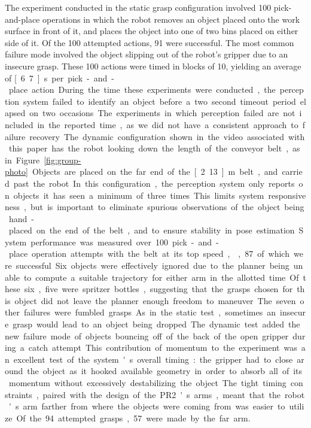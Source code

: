 \documentclass[letterpaper, 10 pt, conference]{ieeeconf}  %
\begin{document}
The experiment conducted in the static grasp configuration involved
100 pick-and-place operations in which the robot removes an object
placed onto the work surface in front of it, and places the object
into one of two bins placed on either side of it. Of the 100 attempted
actions, 91 were successful. The most common failure mode involved the
object slipping out of the robot's gripper due to an insecure
grasp. These 100 actions were timed in blocks of 10, yielding an
average of \unit[6.7]{s} per pick-and-place action. During the time
these experiments were conducted, the perception system failed to
identify an object before a two second timeout period elapsed on two
occasions. The experiments in which perception failed are not included
in the reported time, as we did not have a consistent approach to
failure recovery.

The dynamic configuration shown in the video associated with this
paper has the robot looking down the length of the conveyor belt, as
in Figure~\ref{fig:group-photo}. Objects are placed on the far end of
the \unit[2.13]{m} belt, and carried past the robot. In this
configuration, the perception system only reports on objects it has
seen a minimum of three times. This limits system responsiveness, but
is important to eliminate spurious observations of the object being
hand-placed on the end of the belt, and to ensure stability in pose
estimation.

System performance was measured over 100 pick-and-place operation
attempts with the belt at its top speed, , 87
of which were successful. Six objects were effectively ignored due to
the planner being unable to compute a suitable trajectory for either
arm in the allotted time. Of these six, five were spritzer bottles,
suggesting that the grasps chosen for this object did not leave the
planner enough freedom to maneuver. The seven other failures were
fumbled grasps. As in the static test, sometimes an insecure grasp
would lead to an object being dropped. The dynamic test added the new
failure mode of objects bouncing off of the back of the open gripper
during a catch attempt. This contribution of momentum to the
experiment was an excellent test of the system's overall timing: the
gripper had to close around the object as it hooked available geometry
in order to absorb all of its momentum without excessively
destabilizing the object. The tight timing constraints, paired with
the design of the PR2's arms, meant that the robot's arm farther from
where the objects were coming from was easier to utilize. Of the 94
attempted grasps, 57 were made by the far arm.
\end{document}
